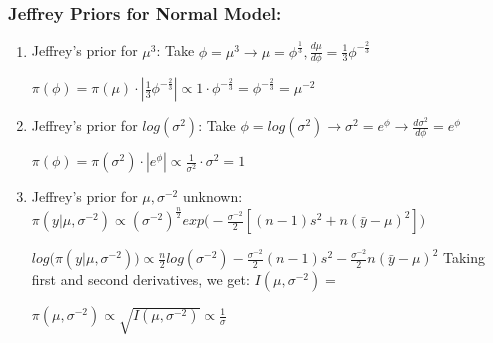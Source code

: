 \documentclass{beamer}
\begin{document}
\begin{frame}
\frametitle{Jeffrey Priors for Normal Model:}
\begin{enumerate}
\item  Jeffrey's prior for $\mu^3$: Take $\phi = \mu^3 \rightarrow \mu = \phi^{\frac{1}{3}}, \frac{d\mu}{d\phi} = \frac{1}{3} \phi^{-\frac{2}{3}}$

$\pi(\phi) = \pi(\mu) \cdot |\frac{1}{3}\phi^{-\frac{2}{3}}| \propto 1 \cdot \phi^{-\frac{2}{3}} = \phi^{-\frac{2}{3}} = \mu^{-2}$

\item  Jeffrey's prior for $log(\sigma^2)$: Take $\phi = log(\sigma^2) \rightarrow \sigma^2 = e^{\phi} \rightarrow \frac{d\sigma^2}{d\phi} = e^{\phi}$

$\pi(\phi) = \pi(\sigma^2) \cdot |e^{\phi}| \propto \frac{1}{\sigma^2} \cdot \sigma^2 = 1$

\item  Jeffrey's prior for $\mu,\sigma^{-2}$ unknown: $\pi(y|\mu,\sigma^{-2}) \propto (\sigma^{-2})^{\frac{n}{2}} exp\Big(-\frac{\sigma^{-2}}{2}[(n-1)s^2 + n(\bar y-\mu)^2]\Big)$

$log\Big(\pi(y|\mu,\sigma^{-2})\Big) \propto \frac{n}{2} log(\sigma^{-2}) -\frac{\sigma^{-2}}{2}(n-1)s^2 -\frac{\sigma^{-2}}{2}n(\bar y-\mu)^2$
Taking first and second derivatives, we get: $I(\mu,\sigma^{-2}) = $

$\pi(\mu,\sigma^{-2}) \propto \sqrt{I(\mu,\sigma^{-2})} \propto \frac{1}{\sigma}$


\end{enumerate}

\end{frame}

\end{document}

